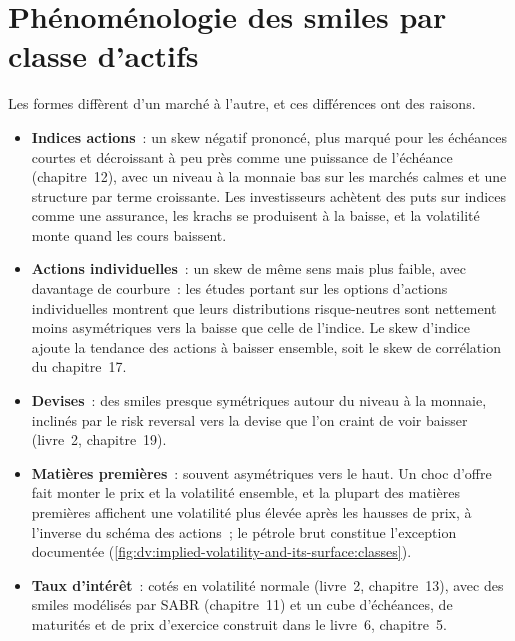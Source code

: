 \section{Phénoménologie des smiles par classe d'actifs}

Les formes diffèrent d'un marché à l'autre, et ces différences ont des raisons.

\begin{itemize}
\item \textbf{Indices actions}~: un skew négatif prononcé, plus marqué pour les échéances courtes et
décroissant à peu près comme une puissance de l'échéance (chapitre~12), avec un niveau
à la monnaie bas sur les marchés calmes et une structure par terme croissante. Les investisseurs achètent des puts sur indices comme
une assurance, les krachs se produisent à la baisse, et la volatilité monte quand les cours baissent.
\item \textbf{Actions individuelles}~: un skew de même sens mais plus faible, avec davantage de courbure~: les études
portant sur les options d'actions individuelles montrent que leurs distributions risque-neutres sont
nettement moins asymétriques vers la baisse que celle de l'indice. Le skew d'indice ajoute la tendance des actions à baisser ensemble,
soit le skew de corrélation du chapitre~17.
\item \textbf{Devises}~: des smiles presque symétriques autour du niveau à la monnaie, inclinés
par le risk reversal vers la devise que l'on craint de voir baisser (livre~2,
chapitre~19).
\item \textbf{Matières premières}~: souvent asymétriques vers le haut. Un choc d'offre fait monter le prix et la
volatilité ensemble, et la plupart des matières premières affichent une volatilité plus élevée après
les hausses de prix, à l'inverse du schéma des actions~; le pétrole brut constitue l'exception
documentée (\cref{fig:dv:implied-volatility-and-its-surface:classes}).
\item \textbf{Taux d'intérêt}~: cotés en volatilité normale (livre~2, chapitre~13),
avec des smiles modélisés par SABR (chapitre~11) et un cube d'échéances, de maturités et de prix d'exercice
construit dans le livre~6, chapitre~5.
\end{itemize}

